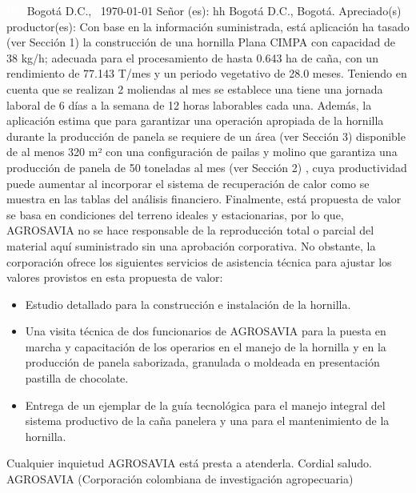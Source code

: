 \documentclass{article}%
\begin{document}
\begin{large}%
\textcolor{white}{ 
HH
}%
\linebreak%
Bogotá D.C., %
\ {\today}%
\newline%
 \newline%
%
\linebreak%
\newline%
Señor (es):%
\newline%
hh%
\newline%
Bogotá D.C., Bogotá.%
\newline%
 \newline%
%
\newline%
Apreciado(s) productor(es):%
\newline%
 \newline%
%
Con base en la información suministrada, está aplicación ha tasado (ver Sección 1) la construcción de una hornilla Plana CIMPA con capacidad de 38 kg/h; adecuada para el procesamiento de hasta 0.643 ha de caña, con un rendimiento de 77.143 T/mes y un periodo vegetativo de 28.0 meses. Teniendo en cuenta que se realizan 2 moliendas al mes se establece una tiene una jornada laboral de 6 días a la semana de 12 horas laborables cada una. \newline%
 Además, la aplicación estima que para garantizar una operación apropiada de la hornilla durante la producción de panela se requiere de un área (ver Sección 3) disponible de al menos 320 m² con una configuración de pailas y molino que garantiza una producción de panela de 50 toneladas al mes (ver Sección 2)%
, cuya productividad puede aumentar al incorporar el sistema de recuperación de calor como se muestra en las tablas del análisis financiero.%
\newline%
 Finalmente, está propuesta de valor se basa en condiciones del terreno ideales y estacionarias, por lo que, AGROSAVIA no se hace responsable de la reproducción total o parcial del material aquí suministrado sin una aprobación corporativa. No obstante, la corporación ofrece los siguientes servicios de asistencia técnica para ajustar los valores provistos en esta propuesta de valor:%
\begin{itemize}%
\item%
Estudio detallado para la construcción e instalación de la hornilla.%
\item%
Una visita técnica de dos funcionarios de AGROSAVIA para la puesta en marcha y capacitación de los operarios en el manejo de la hornilla y en la producción de panela saborizada, granulada o moldeada en presentación pastilla de chocolate.%
\item%
Entrega de un ejemplar de la guía tecnológica para el manejo integral del sistema productivo de la caña panelera y una para el mantenimiento de la hornilla.%
\end{itemize}%
Cualquier inquietud AGROSAVIA está presta a atenderla.\newline%
Cordial saludo.\newline%
\newline%
 \newline%
 \newline%
 \newline%
AGROSAVIA (Corporación colombiana de investigación agropecuaria)%
\end{large}%
\end{document}
